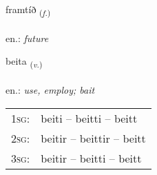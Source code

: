 \documentclass[frontgrid, backgrid]{flacards}\usepackage[]{graphicx}\usepackage[]{xcolor}
\begin{document}
\renewcommand{\blhead}{\vskip5pt {\small\bfseries\footnotesize Nafnorð | Noun }}
\renewcommand{\bcfoot}{\vskip5pt \hspace{2pt}{\small\bfseries\footnotesize 1K}}


{framtíð \small{\textsubscript{(\textit{f.})}} \\[1ex] %
\textphonetic{[framtʰið]} \\
en.: \emph{future} \\  [2ex]
\renewcommand*{\arraystretch}{0.8}
}

\renewcommand{\flhead}{\vskip5pt \fboxsep=0pt {\small\bfseries\footnotesize Sagnorð | Verb}}
\renewcommand{\fcfoot}{\vskip5pt \fboxsep=0pt \hspace{2pt}{\small\bfseries\footnotesize 1K}}

\renewcommand{\blhead}{\vskip5pt {\small\bfseries\footnotesize Sagnorð | Verb }}
\renewcommand{\bcfoot}{\vskip5pt \hspace{2pt}{\small\bfseries\footnotesize 1K}}


{beita \small{\textsubscript{(\textit{v.})}} \\[1ex] %
\textphonetic{[peiːta]} \\
en.: \emph{use, employ; bait} \\  [2ex]
\renewcommand*{\arraystretch}{0.8}
\begin{tabular}{p{1cm}l}
\textsc{1sg}: & beiti -- beitti -- beitt \\ 
\textsc{2sg}: & beitir -- beittir -- beitt \\ 
\textsc{3sg}: & beitir -- beitti -- beitt \\ 
\end{tabular}
}

\renewcommand{\flhead}{\vskip5pt \fboxsep=0pt {\small\bfseries\footnotesize Lýsingarorð | Adjective}}
\renewcommand{\fcfoot}{\vskip5pt \fboxsep=0pt \hspace{2pt}{\small\bfseries\footnotesize 1K}}
\end{document}
